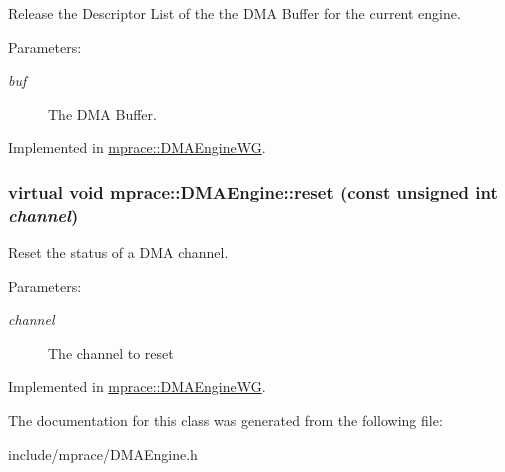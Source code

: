 Release the Descriptor List of the the DMA Buffer for the current engine. 

\begin{Desc}
\item[Parameters:]
\begin{description}
\item[{\em buf}]The DMA Buffer.\end{description}
\end{Desc}


Implemented in \hyperlink{classmprace_1_1DMAEngineWG_a7}{mprace::DMAEngine\-WG}.\hypertarget{classmprace_1_1DMAEngine_a2}{
\subsubsection[reset]{\setlength{\rightskip}{0pt plus 5cm}virtual void mprace::DMAEngine::reset (const unsigned int {\em channel})}}
\label{classmprace_1_1DMAEngine_a2}


Reset the status of a DMA channel. 

\begin{Desc}
\item[Parameters:]
\begin{description}
\item[{\em channel}]The channel to reset\end{description}
\end{Desc}


Implemented in \hyperlink{classmprace_1_1DMAEngineWG_a3}{mprace::DMAEngine\-WG}.

The documentation for this class was generated from the following file:\begin{CompactItemize}
\item 
include/mprace/DMAEngine.h\end{CompactItemize}
